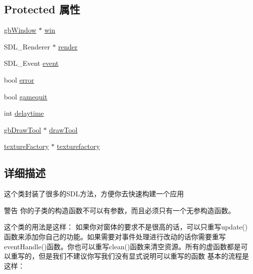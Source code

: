 \subsection*{Protected 属性}
\begin{DoxyCompactItemize}
\item 
\mbox{\hyperlink{classgb_window}{gb\+Window}} $\ast$ \mbox{\hyperlink{class_game_body_a66e2f55c012e92d4723a08a642722777}{win}}
\item 
S\+D\+L\+\_\+\+Renderer $\ast$ \mbox{\hyperlink{class_game_body_a7325fa39af4c769a643b9bc5805a0e28}{render}}
\item 
S\+D\+L\+\_\+\+Event \mbox{\hyperlink{class_game_body_a7a7f0234ae77e1aae482522badaca124}{event}}
\item 
bool \mbox{\hyperlink{class_game_body_a82d0d6fedddd6b802691d3b35e699141}{error}}
\item 
bool \mbox{\hyperlink{class_game_body_ae2777759c863e6610b0aa90888c99b95}{gamequit}}
\item 
int \mbox{\hyperlink{class_game_body_a7a92a21e03a1032a60fa925d21d4a54a}{delaytime}}
\item 
\mbox{\hyperlink{classgb_draw_tool}{gb\+Draw\+Tool}} $\ast$ \mbox{\hyperlink{class_game_body_a009989bbf848a759a89ed782a9615452}{draw\+Tool}}
\item 
\mbox{\hyperlink{classtexture_factory}{texture\+Factory}} $\ast$ \mbox{\hyperlink{class_game_body_ad52b4b5197b5ed1e4b8c3e000e751eb1}{texturefactory}}
\end{DoxyCompactItemize}


\subsection{详细描述}
这个类封装了很多的\+S\+D\+L方法，方便你去快速构建一个应用 

\begin{DoxyWarning}{警告}
你的子类的构造函数不可以有参数，而且必须只有一个无参构造函数。
\end{DoxyWarning}
这个类的用法是这样： 如果你对窗体的要求不是很高的话，可以只重写update()函数来添加你自己的功能。如果需要对事件处理进行改动的话你需要重写event\+Handle()函数。你也可以重写clean()函数来清空资源。所有的虚函数都是可以重写的，但是我们不建议你写我们没有显式说明可以重写的函数 基本的流程是这样： 
\begin{DoxyCode}{0}
\DoxyCodeLine{        \textcolor{comment}{//TODO Initialize....}}
\DoxyCodeLine{    \}}
\DoxyCodeLine{ \textcolor{comment}{//TODO Other Override....}}
\DoxyCodeLine{\};}
\DoxyCodeLine{ }
\DoxyCodeLine{\}}
\end{DoxyCode}
 

